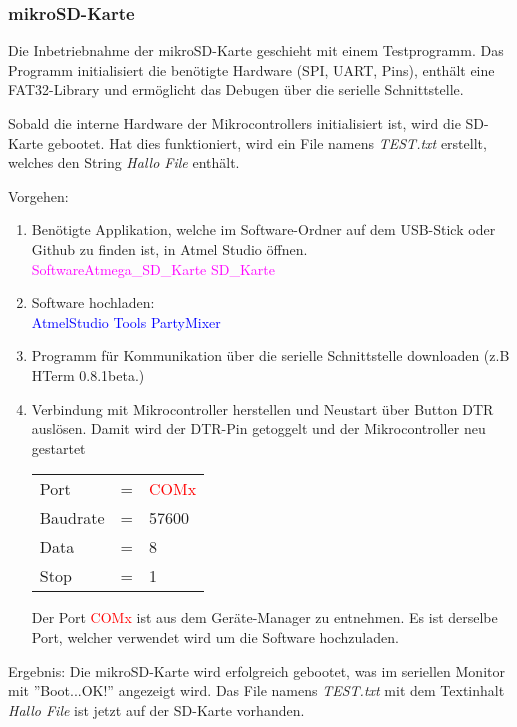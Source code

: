 \subsubsection{mikroSD-Karte}
\label{subsubsec:Inbetriebnahme_mikroSD_Karte}

Die Inbetriebnahme der mikroSD-Karte geschieht mit einem Testprogramm. Das Programm initialisiert die benötigte Hardware (SPI, UART, Pins), enthält eine FAT32-Library und ermöglicht das Debugen über die serielle Schnittstelle.

Sobald die interne Hardware der Mikrocontrollers initialisiert ist, wird die SD-Karte gebootet. Hat dies funktioniert, wird ein File namens \textit{TEST.txt} erstellt, welches den String \textit{Hallo File} enthält.

Vorgehen:
\begin{enumerate}
\item Benötigte Applikation, welche im Software-Ordner auf dem USB-Stick oder Github \cite{aebi_projekt-6softwareatmega_2020} zu finden ist, in Atmel Studio öffnen.\\
\textcolor{magenta}{Software\textrightarrow Atmega\_SD\_Karte \textrightarrow SD\_Karte}\\

\item Software hochladen:\\
\textcolor{blue}{AtmelStudio \textrightarrow Tools \textrightarrow PartyMixer}\\

\item Programm für Kommunikation über die serielle Schnittstelle downloaden (z.B HTerm 0.8.1beta.)\cite{hammer_hterm_nodate}\\
\item Verbindung mit Mikrocontroller herstellen und Neustart über Button DTR auslösen. Damit wird der DTR-Pin getoggelt und der Mikrocontroller neu gestartet\\

\begin{table}[h!]
\center
\begin{tabular}{lcl}
Port & = & \textcolor{red}{COMx} \\
Baudrate & = & 57600 \\
Data & = & 8 \\
Stop & = & 1 \\
\end{tabular}
\end{table}

Der Port \textcolor{red}{COMx} ist aus dem Geräte-Manager zu entnehmen. Es ist derselbe Port, welcher verwendet wird um die Software hochzuladen.\\

\end{enumerate}

Ergebnis: Die mikroSD-Karte wird erfolgreich gebootet, was im seriellen Monitor mit ''Boot...OK!'' angezeigt wird. Das File namens \textit{TEST.txt} mit dem Textinhalt \textit{Hallo File} ist jetzt auf der SD-Karte vorhanden.